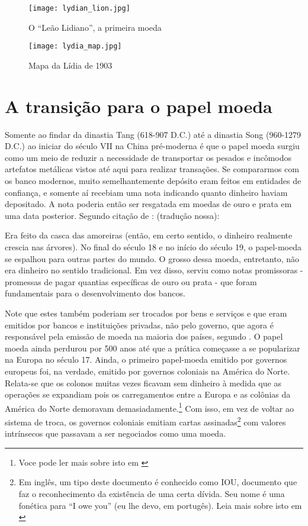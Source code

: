 \begin{figure}[H]\label{lydian1}
	\centering
	\caption{O ``Leão Lidiano'', a primeira moeda}
	\texttt{[image: lydian\_lion.jpg]} 
	\\
\end{figure}
\begin{figure}[H]\label{lydian2}
	\centering 
	\caption{Mapa da Lídia de 1903}
	\texttt{[image: lydia\_map.jpg]}\\
\end{figure} 

\section{A transição para o papel moeda}

Somente ao findar da dinastia Tang (618-907 D.C.) até a dinastia Song (960-1279 D.C.) ao iniciar do século VII na China pré-moderna é que o papel moeda surgiu como um meio de reduzir a necessidade de transportar os pesados e incômodos artefatos metálicas vistos até aqui para realizar transações. Se compararmos com os banco modernos, muito semelhantemente  depósito eram feitos em entidades de confiança, e somente aí recebiam uma nota indicando quanto dinheiro haviam depositado. A nota poderia então ser resgatada em moedas de ouro e prata em uma data posterior. Segundo citação de \cite{BRIT}: (tradução nossa):

\begin{citacao}
	Era feito da casca das amoreiras (então, em certo sentido, o dinheiro realmente crescia nas árvores). No final do século 18 e no início do século 19, o papel-moeda se espalhou para outras partes do mundo. O grosso dessa moeda, entretanto, não era dinheiro no sentido tradicional. Em vez disso, serviu como notas promissoras - promessas de pagar quantias específicas de ouro ou prata - que foram fundamentais para o desenvolvimento dos bancos.
	\end{citacao}

Note que estes também poderiam ser trocados por bens e serviços e que eram emitidos por bancos e instituições privadas, não pelo governo, que agora é responsável pela emissão de moeda na maioria dos países, segundo \cite{BRIT2}. O papel moeda ainda perdurou por 500 anos até que a prática começasse a se popularizar na Europa no século 17. Ainda, o primeiro papel-moeda emitido por governos europeus foi, na verdade, emitido por governos coloniais na América do Norte. Relata-se que os colonos muitas vezes ficavam sem dinheiro à medida que as operações se expandiam pois os carregamentos entre a Europa e as colônias da América do Norte demoravam demasiadamente.\footnote{Voce pode ler mais sobre isto em \cite{TEXAS}} Com isso, em vez de voltar ao sistema de troca, os governos coloniais emitiam cartas assinadas\footnote{Em inglês, um tipo deste documento é conhecido como IOU, documento que faz o reconhecimento da existência de uma certa dívida. Seu nome é uma fonética para ``I owe you'' (eu lhe devo, em portugês). Leia mais sobre isto em \cite{KENTON}} com valores intrínsecos que passavam a ser negociados como uma moeda.


